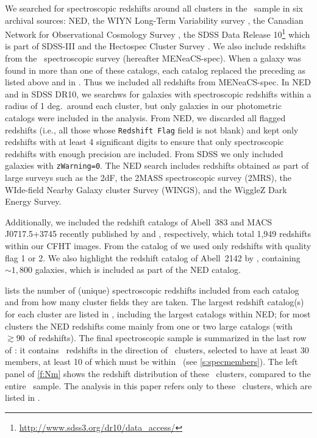 We searched for spectroscopic redshifts around all clusters in the \mc\ sample in six archival 
sources: NED, the WIYN Long-Term Variability survey \citep[WLTV;][]{crawford11}, the Canadian 
Network for Observational Cosmology Survey \citep[CNOC;][]{yee96,yee98,ellingson97,abraham98}, the 
SDSS Data Release 10\footnote{\url{http://www.sdss3.org/dr10/data_access/}} 
\citep[DR10;][]{sdss10} 
which is part of SDSS-III \citep{sdss9} and the Hectospec Cluster Survey \citep[HeCS;][]{rines13}. 
We also include redshifts from the \meneacs\ spectroscopic survey (hereafter MENeaCS-spec). When a 
galaxy was found in more than one of these catalogs, each catalog replaced the preceding as listed 
above and in . Thus we included all redshifts from MENeaCS-spec. In NED and in 
SDSS DR10, we searchws for galaxies with spectroscopic redshifts within a radius of 1 deg.\ around 
each cluster, but only galaxies in our photometric catalogs were included in the analysis. From 
NED, we discarded all flagged redshifts (i.e., all those whose \texttt{Redshift Flag} field is not 
blank) and kept only redshifts with at least 4 significant digits to ensure that only spectroscopic 
redshifts with enough precision are included. From SDSS we only included galaxies with 
\texttt{zWarning=0}. The NED search includes redshifts obtained as part of large surveys such as 
the 2dF, the 2MASS spectroscopic survey (2MRS), the WIde-field Nearby Galaxy cluster Survey 
(WINGS), and the WiggleZ Dark Energy Survey.

Additionally, we included the redshift catalogs of Abell~383 and MACS \linebreak J0717.5+3745 recently published by \cite{geller14} and \cite{ebeling14}, respectively, which total 1,949 redshifts within our CFHT images. From the catalog of \cite{ebeling14} we used only redshifts with quality flag 1 or 2. We also highlight the redshift catalog of Abell~2142 by \cite{owers11}, containing $\sim\!1,800$ galaxies, which is included as part of the NED catalog.

 lists the number of (unique) spectroscopic redshifts included from each catalog 
and from how many cluster fields they are taken. The largest redshift catalog(s) for each cluster 
are listed in , including the largest catalogs within NED; for most clusters the 
NED redshifts come mainly from one or two large catalogs (with $\gtrsim90$\percent\ of redshifts). The 
final spectroscopic sample is summarized in the last row of : it contains \Nspec\ 
redshifts in the direction of \Ncl\ clusters, selected to have at least 30 members, at least 10 of 
which must be within \radius\ (see \cref{s:specmembers}). The left panel of \cref{f:Nm} shows the 
redshift distribution of these \Ncl\ clusters, compared to the entire \mc\ sample. The analysis in 
this paper refers only to these \Ncl\ clusters, which are listed in \Cref{t:dynamics}.


